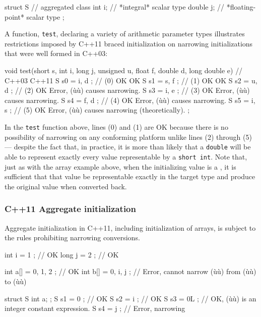 \begin{emcppslisting}[emcppsbatch=e3]
struct S  // aggregated class
{
    int    i;  // *integral* scalar type
    double j;  // *floating-point* scalar type
};
\end{emcppslisting}
    

\noindent A function, \lstinline!test!, declaring a variety of arithmetic parameter
types illustrates restrictions imposed by C++11 braced initialization on
narrowing initializations that were well formed in C++03:

\begin{emcppslisting}[emcppsbatch=e3,emcppserrorlines={5,6,7,8}]
void test(short s, int i, long j, unsigned u, float f, double d, long double e)
{                     //     C++03  C++11
    S s0 = { i, d };  // (0)  OK     OK
    S s1 = { s, f };  // (1)  OK     OK
    S s2 = { u, d };  // (2)  OK    Error, (ù{}ù) causes narrowing.
    S s3 = { i, e };  // (3)  OK    Error, (ù{}ù) causes narrowing.
    S s4 = { f, d };  // (4)  OK    Error, (ù{}ù) causes narrowing.
    S s5 = { i, s };  // (5)  OK    Error, (ù{}ù) causes narrowing (theoretically).
};
\end{emcppslisting}
    

\noindent In the \lstinline!test! function above, lines (0) and (1) are OK because
there is no possibility of narrowing on any conforming platform unlike
lines (2) through (5) --- despite the fact that, in practice, it is more
than likely that a \lstinline!double! will be able to represent exactly
every value representable by a \lstinline!short!~\lstinline!int!. Note that,
just as with the array example above, when the initializing value is a
, it is sufficient that that value be
representable exactly in the target type and produce the original value
when converted back.

\subsubsection[C++11 Aggregate initialization]{C++11 Aggregate initialization}\label{c++11-aggregate-initialization}

Aggregate initialization in C++11, including initialization of arrays,
is subject to the rules prohibiting narrowing conversions.

\begin{emcppslisting}
int  i   = { 1 };        // OK
long j   = { 2 };        // OK

int  a[] = { 0, 1, 2 };  // OK
int  b[] = { 0, i, j };  // Error, cannot narrow (ù{}ù) from (ù{}ù) to (ù{}ù)

struct S { int a; };
S s1 = { 0  };  // OK
S s2 = { i  };  // OK
S s3 = { 0L };  // OK, (ù{}ù) is an integer constant expression.
S s4 = { j  };  // Error, narrowing
\end{emcppslisting}
    

